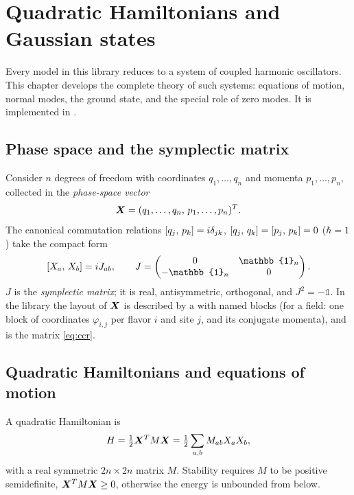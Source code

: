 \chapter{Quadratic Hamiltonians and Gaussian states}\label{chap:gaussian}

Every model in this library reduces to a system of coupled harmonic oscillators. This chapter develops the
complete theory of such systems: equations of motion, normal modes, the ground state, and the special role of
zero modes. It is implemented in .

\section{Phase space and the symplectic matrix}
Consider $n$ degrees of freedom with coordinates $q_1,\dots,q_n$ and momenta $p_1,\dots,p_n$, collected in the
\emph{phase-space vector}
\begin{equation}
  \bm{X} = (q_1,\dots,q_n,\,p_1,\dots,p_n)^T .
\end{equation}
The canonical commutation relations $[q_j,\,p_k] = i\delta_{jk}$, $[q_j,\,q_k]=[p_j,\,p_k]=0$
($\hbar = 1$) take the compact form
\begin{equation}\label{eq:ccr}
  \comm{X_a}{X_b} = i J_{ab}, \qquad
  J = \begin{pmatrix} 0 & \mathbb{1}_n \\ -\mathbb{1}_n & 0 \end{pmatrix}.
\end{equation}
$J$ is the \emph{symplectic matrix}; it is real, antisymmetric, orthogonal, and $J^2 = -\mathbb{1}$.
In the library the layout of $\bm{X}$ is described by a  with named blocks (for a field: one block
of coordinates $\varphi_{i,j}$ per flavor $i$ and site $j$, and its conjugate momenta), and 
is the matrix \eqref{eq:ccr}.

\section{Quadratic Hamiltonians and equations of motion}
A quadratic Hamiltonian is
\begin{equation}\label{eq:quadratic-H}
  H = \tfrac12 \bm{X}^T M \bm{X} = \tfrac12 \sum_{a,b} M_{ab} X_a X_b ,
\end{equation}
with a real symmetric $2n\times 2n$ matrix $M$. Stability requires $M$ to be positive semidefinite,
$\bm{X}^T M \bm{X} \geq 0$, otherwise the energy is unbounded from below.

